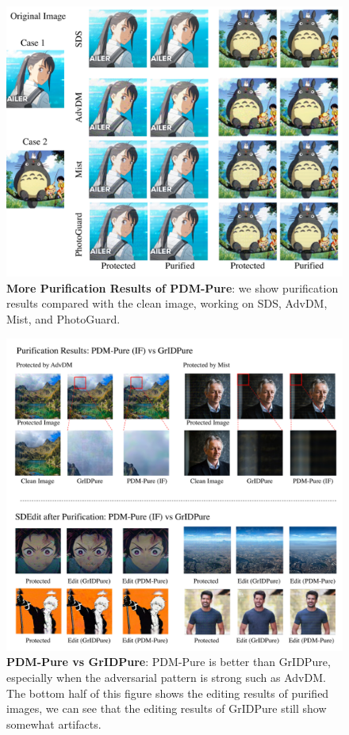 \begin{figure}
    \centering
    \includegraphics[width=.99\textwidth]{images/supp/pdm_pure_visualize.pdf}
    \caption{\textbf{More Purification Results of PDM-Pure}: we show purification results compared with the clean image, working on SDS, AdvDM, Mist, and PhotoGuard.}
    \label{fig:supp:pdm_pure_visualize}
\end{figure}

\begin{figure}
    \centering
\includegraphics[width=.99\textwidth]{images/supp/pdm_pure_baselines.pdf}
    \caption{
    \textbf{PDM-Pure vs GrIDPure}: PDM-Pure is better than GrIDPure, especially when the adversarial pattern is strong such as AdvDM. The bottom half of this figure shows the editing results of purified images, we can see that the editing results of GrIDPure still show somewhat artifacts.}
    \label{fig:supp:pdm_pure_compared with gridpure}
\end{figure}


